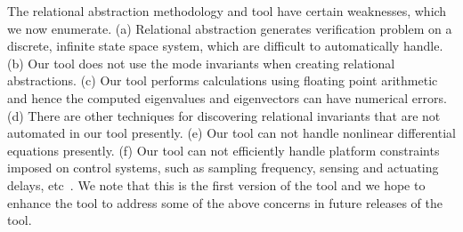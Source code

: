 \documentclass{llncs}
\begin{document}
The relational abstraction methodology and tool have certain
weaknesses, which we now enumerate.  
(a) Relational abstraction generates verification 
problem on a discrete, infinite state space system, which are difficult to
automatically handle.  
(b) Our tool does not use the mode invariants when creating
relational abstractions.  %
(c) Our tool performs calculations using floating point 
arithmetic and hence the computed eigenvalues and eigenvectors
can have numerical errors.  
(d) There are other techniques for discovering relational
invariants that are not automated in our tool presently.
(e) Our tool %
can not handle nonlinear differential equations presently.
(f) Our tool can not efficiently handle platform constraints
imposed on control systems, such as sampling frequency, 
sensing and actuating delays, etc~\cite{ZST12:CAV}.%
We note that this is the first version of the tool and we hope to
enhance the tool to address some of the above concerns in 
future releases of the tool.



%
%
%
%
%
\end{document}
